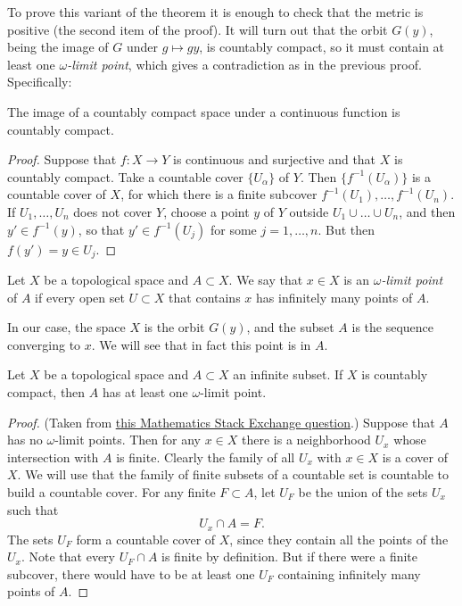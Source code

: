 To prove this variant of the theorem it
is enough to check that the metric is
positive (the second item of the
proof). It will turn out that the orbit
$G(y)$, being the image of $G$ under
$g\mapsto gy$, is countably compact, so
it must contain at least one
{\it $\omega$-limit point}, which gives
a contradiction as in the previous
proof. Specifically:

\begin{proposition}
\label{proposition-image-countably-compact}
The image of a countably compact space
under a continuous function is
countably compact.
\end{proposition}

\begin{proof}
Suppose that $f:X\to Y$ is continuous
and surjective and that $X$ is
countably compact. Take a countable
cover $\{U_\alpha\}$ of $Y$. Then
$\{f^{-1}(U_\alpha)\}$ is a countable
cover of $X$, for which there is a
finite subcover
$f^{-1}(U_1),\ldots,f^{-1}(U_n)$. If
$U_1,\ldots,U_n$ does not cover $Y$,
choose a point $y$ of $Y$ outside
$U_1\cup\ldots\cup U_n$, and then
$y'\in f^{-1}(y)$, so that
$y'\in f^{-1}(U_j)$ for some
$j=1,\ldots,n$. But then
$f(y')=y\in U_j$.
\end{proof}

\begin{definition}
\label{definition-omega-limit-point}
Let $X$ be a topological space and
$A\subset X$. We say that $x\in X$ is
an {\it $\omega$-limit point} of $A$ if
every open set $U\subset X$ that
contains $x$ has infinitely many points
of $A$.
\end{definition}

In our case, the space $X$ is the orbit
$G(y)$, and the subset $A$ is the
sequence converging to $x$. We will see
that in fact this point is in $A$.

\begin{proposition}
\label{proposition-omega-limit-point}
Let $X$ be a topological space and
$A\subset X$ an infinite subset. If $X$
is countably compact, then $A$ has at
least one $\omega$-limit point.
\end{proposition}

\begin{proof}
(Taken from
\href{https://math.stackexchange.com/%
questions/1817245/%
a-topological-space-is-countably-%
compact-iff-every-countably-infinite-%
subset-has}{this Mathematics Stack
Exchange question}.) Suppose that $A$
has no $\omega$-limit points. Then for
any $x\in X$ there is a neighborhood
$U_x$ whose intersection with $A$ is
finite. Clearly the family of all $U_x$
with $x\in X$ is a cover of $X$. We
will use that the family of finite
subsets of a countable set is countable
to build a countable cover. For any
finite $F\subset A$, let $U_F$ be the
union of the sets $U_x$ such that
$$
U_x\cap A=F.
$$
The sets $U_F$ form a countable cover
of $X$, since they contain all the
points of the $U_x$. Note that every
$U_F\cap A$ is finite by definition.
But if there were a finite subcover,
there would have to be at least one
$U_F$ containing infinitely many points
of $A$.
\end{proof}

